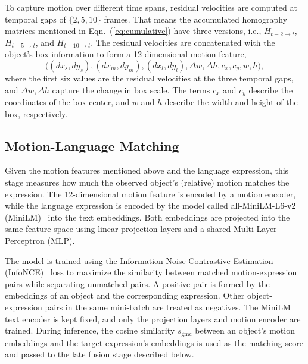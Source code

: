\documentclass{article}
\begin{document}
To capture motion over different time spans, residual velocities are computed at temporal gaps of $\{2,5,10\}$ frames. That means the accumulated homography matrices mentioned in Eqn.~(\ref{eq:cumulative}) have three versions, i.e., $H_{t-2 \to t}$, $H_{t-5 \to t}$, and $H_{t-10 \to t}$. The residual velocities are concatenated with the object's box information to form a 12-dimensional motion feature,
\begin{equation}
  \bigl((dx_s,dy_s),(dx_m,dy_m),(dx_l,dy_l),\Delta w,\Delta h,c_x,c_y,w,h\bigr),
  \label{eq:descriptor}
\end{equation}
where the first six values are the residual velocities at the three temporal gaps, and $\Delta w, \Delta h$ capture the change in box scale. The terms $c_x$ and $c_y$ describe the coordinates of the box center, and $w$ and $h$ describe the width and height of the box, respectively.

\subsection{Motion-Language Matching}
\label{sec:align}
Given the motion features mentioned above and the language expression, this stage measures how much the observed object's (relative) motion matches the expression. The 12-dimensional motion feature is encoded by a motion encoder, while the language expression is encoded by the model called all-MiniLM-L6-v2 (MiniLM)~\cite{sbert} into the text embeddings. Both embeddings are projected into the same feature space using linear projection layers and a shared Multi-Layer Perceptron (MLP).

The model is trained using the Information Noise Contrastive Estimation (InfoNCE)~\cite{infonce} loss to maximize the similarity between matched motion-expression pairs while separating unmatched pairs. A positive pair is formed by the embeddings of an object and the corresponding expression. Other object-expression pairs in the same mini-batch are treated as negatives. The MiniLM text encoder is kept fixed, and only the projection layers and motion encoder are trained. During inference, the cosine similarity $s_{\mathrm{gmc}}$ between an object's motion embeddings and the target expression's embeddings is used as the matching score and passed to the late fusion stage described below.
\end{document}
